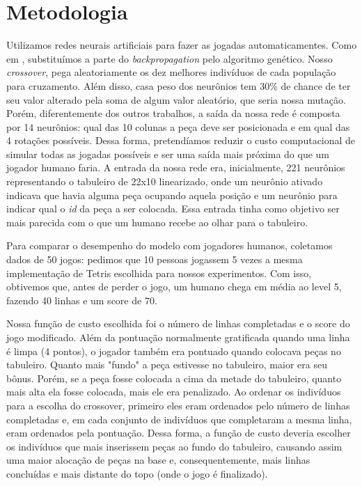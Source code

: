 \documentclass[conference]{IEEEtran}
\begin{document}
\section{Metodologia}
Utilizamos redes neurais artificiais para fazer as jogadas automaticamentes. Como em \cite{b8}, substituímos a parte do \textit{backpropagation} pelo algoritmo genético. Nosso \textit{crossover}, pega aleatoriamente os dez melhores indivíduos de cada população para cruzamento. Além disso, casa peso dos neurônios tem 30\% de chance de ter seu valor alterado pela soma de algum valor aleatório, que seria nossa mutação.   Porém, diferentemente dos outros trabalhos, a saída da nossa rede é composta por 14 neurônios: qual das 10 colunas a peça deve ser posicionada e em qual das 4 rotações possíveis. Dessa forma, pretendíamos reduzir o custo computacional de simular todas as jogadas possíveis e ser uma saída mais próxima do que um jogador humano faria. A entrada da nossa rede era, inicialmente, 221 neurônios representando o tabuleiro de 22x10 linearizado, onde um neurônio ativado indicava que havia alguma peça ocupando aquela posição e um neurônio para indicar qual o \textit{id} da peça a ser colocada. Essa entrada tinha como objetivo ser mais parecida com o que um humano recebe ao olhar para o tabuleiro.

Para comparar o desempenho do modelo com jogadores humanos, coletamos dados de 50 jogos: pedimos que 10 pessoas jogassem 5 vezes a mesma implementação de Tetris escolhida para nossos experimentos. Com isso, obtivemos que, antes de perder o jogo, um humano chega em média ao level 5, fazendo 40 linhas e um score de 70.

Nossa função de custo escolhida foi o número de linhas completadas e o score do jogo modificado. Além da pontuação normalmente gratificada quando uma linha é limpa (4 pontos), o jogador também era pontuado quando colocava peças no tabuleiro. Quanto mais "fundo" a peça estivesse no tabuleiro, maior era seu bônus. Porém, se a peça fosse colocada a cima da metade do tabuleiro, quanto mais alta ela fosse colocada, mais ele era penalizado. Ao ordenar os indivíduos para a escolha do crossover, primeiro eles eram ordenados pelo número de linhas completadas e, em cada conjunto de indivíduos que completaram a mesma linha, eram ordenados pela pontuação. Dessa forma, a função de custo deveria escolher os indivíduos que mais inserissem peças ao fundo do tabuleiro, causando assim uma maior alocação de peças na base e, consequentemente, mais linhas concluídas e mais distante do topo (onde o jogo é finalizado).
\end{document}
